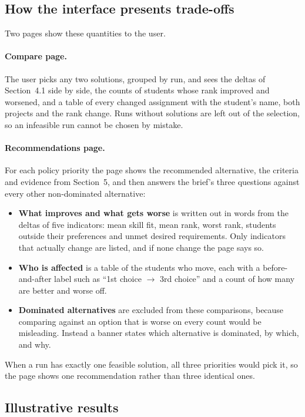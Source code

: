\documentclass[11pt,a4paper]{article}
\begin{document}
\subsection{How the interface presents trade-offs}
Two pages show these quantities to the user.

\paragraph{Compare page.} The user picks any two solutions, grouped by run,
and sees the deltas of Section~4.1 side by side, the counts of students
whose rank improved and worsened, and a table of every changed assignment
with the student's name, both projects and the rank change. Runs without
solutions are left out of the selection, so an infeasible run cannot be
chosen by mistake.

\paragraph{Recommendations page.} For each policy priority the page shows
the recommended alternative, the criteria and evidence from Section~5, and
then answers the brief's three questions against every other
non-dominated alternative:
\begin{itemize}
  \item \textbf{What improves and what gets worse} is written out in words
        from the deltas of five indicators: mean skill fit, mean rank,
        worst rank, students outside their preferences and unmet desired
        requirements. Only indicators that actually change are listed, and
        if none change the page says so.
  \item \textbf{Who is affected} is a table of the students who move,
        each with a before-and-after label such as ``1st choice $\to$ 3rd
        choice'' and a count of how many are better and worse off.
  \item \textbf{Dominated alternatives} are excluded from these
        comparisons, because comparing against an option that is worse on
        every count would be misleading. Instead a banner states which
        alternative is dominated, by which, and why.
\end{itemize}
When a run has exactly one feasible solution, all three priorities would
pick it, so the page shows one recommendation rather than three identical
ones.

\subsection{Illustrative results}
\end{document}
